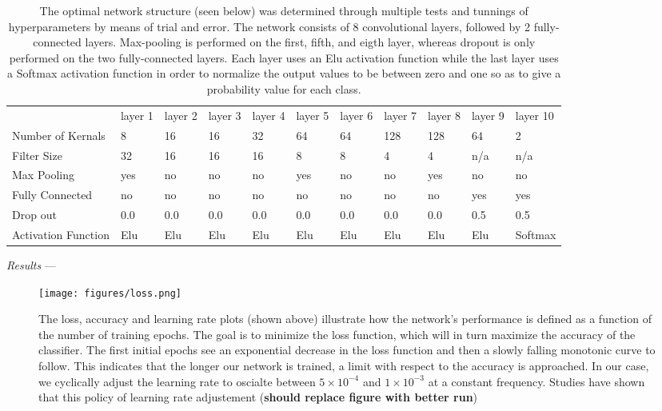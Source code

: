 \documentclass[%
 amsmath,amssymb,
 aps,
 twocolumn,
floatfix,
]{revtex4-1}
\begin{document}
\begin{table}[!h]
\centering
\caption{The optimal network structure (seen below) was determined through multiple tests and tunnings of hyperparameters by means of trial and error. The network consists of 8 convolutional layers, followed by 2 fully-connected layers. Max-pooling is performed on the first, fifth, and eigth layer, whereas dropout is only performed on the two fully-connected layers. Each layer uses an Elu activation function while the last layer uses a Softmax activation function in order to normalize the output values to be between zero and one so as to give a probability value for each class. \\} 
\label{table:network}
\begin{tabular}{lllllllllll}
                    & layer 1 & layer 2 & layer 3 & layer 4 & layer 5 & layer 6 & layer 7 & layer 8 & layer 9 & layer 10 \\
Number of Kernals   & 8       & 16      & 16      & 32      & 64      & 64      & 128     & 128     & 64      & 2        \\
Filter Size         & 32      & 16      & 16      & 16      & 8       & 8       & 4       & 4       & n/a     & n/a      \\
Max Pooling         & yes       & no       & no       & no       & yes       & no       & no       & yes       & no     & no      \\
Fully Connected     & no     & no     & no     & no     & no     & no     & no     & no     & yes     & yes      \\
Drop out            & 0.0     & 0.0     & 0.0     & 0.0     & 0.0     & 0.0     & 0.0     & 0.0     & 0.5     & 0.5      \\
Activation Function & Elu     & Elu     & Elu     & Elu     & Elu     & Elu     & Elu     & Elu     & Elu     & Softmax 
\end{tabular}
\end{table}

\textit{Results} --- 

\begin{figure}[!h]
 \texttt{[image: figures/loss.png]}
 \caption{\label{fig:loss_curve} The loss, accuracy and learning rate plots (shown above) illustrate how the network's performance is defined as a function of the number of training epochs. The goal is to minimize the loss function, which will in turn maximize the accuracy of the classifier. The first initial epochs see an exponential decrease in the loss function and then a slowly falling monotonic curve to follow. This indicates that the longer our network is trained, a limit with respect to the accuracy is approached. In our case, we cyclically adjust the learning rate to oscialte between $5 \times 10^{-4}$ and $1 \times 10^{-3}$ at a constant frequency. Studies have shown that this policy of learning rate adjustement (\textbf{should replace figure with better run})
}
\end{figure}
\end{document}
